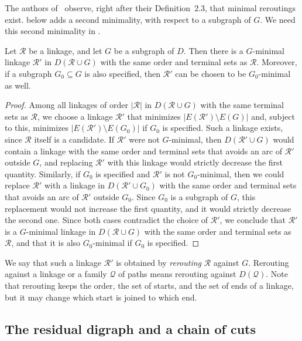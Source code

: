\documentclass[fontsize=12pt,leading=14pt]{fullpaper}
\newcommand{\Qcal}{\mathcal{Q}}
\newcommand{\Rcal}{\mathcal{R}}
\begin{document}
The authors of~\cite{HKMM26a} observe, right after their Definition~2.3, that minimal reroutings exist.
 below adds a second minimality, with respect to a subgraph of $G$.
We need this second minimality in .

\begin{lemma}\label{lem:reroute-exists}
  Let $\Rcal$ be a linkage, and let $G$ be a subgraph of $D$.
  Then there is a $G$-minimal linkage $\Rcal'$ in $D(\Rcal\cup G)$ with the same order and terminal sets as $\Rcal$.
  Moreover, if a subgraph $G_0\subseteq G$ is also specified, then $\Rcal'$ can be chosen to be $G_0$-minimal as well.
\end{lemma}

\begin{proof}
  Among all linkages of order $|\Rcal|$ in $D(\Rcal\cup G)$ with the same terminal sets as $\Rcal$, we choose a linkage $\Rcal'$ that minimizes $|E(\Rcal')\setminus E(G)|$ and, subject to this, minimizes $|E(\Rcal')\setminus E(G_0)|$ if $G_0$ is specified.
  Such a linkage exists, since $\Rcal$ itself is a candidate.
  If $\Rcal'$ were not $G$-minimal, then $D(\Rcal'\cup G)$ would contain a linkage with the same order and terminal sets that avoids an arc of $\Rcal'$ outside $G$, and replacing $\Rcal'$ with this linkage would strictly decrease the first quantity.
  Similarly, if $G_0$ is specified and $\Rcal'$ is not $G_0$-minimal, then we could replace $\Rcal'$ with a linkage in $D(\Rcal'\cup G_0)$ with the same order and terminal sets that avoids an arc of $\Rcal'$ outside $G_0$.
  Since $G_0$ is a subgraph of $G$, this replacement would not increase the first quantity, and it would strictly decrease the second one.
  Since both cases contradict the choice of $\Rcal'$, we conclude that $\Rcal'$ is a $G$-minimal linkage in $D(\Rcal\cup G)$ with the same order and terminal sets as $\Rcal$, and that it is also $G_0$-minimal if $G_0$ is specified.
\end{proof}

We say that such a linkage $\Rcal'$ is obtained by \emph{rerouting} $\Rcal$ against $G$.
Rerouting against a linkage or a family $\Qcal$ of paths means rerouting against $D(\Qcal)$.
Note that rerouting keeps the order, the set of starts, and the set of ends of a linkage, but it may change which start is joined to which end.

\subsection{The residual digraph and a chain of cuts}\label{sec:time-cuts}
\end{document}
